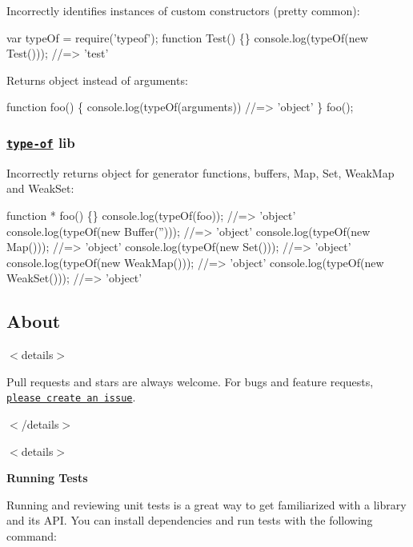 Incorrectly identifies instances of custom constructors (pretty common)\+:


\begin{DoxyCode}
var typeOf = require('typeof');
function Test() \{\}
console.log(typeOf(new Test()));
//=> 'test'
\end{DoxyCode}


Returns {\ttfamily object} instead of {\ttfamily arguments}\+:


\begin{DoxyCode}
function foo() \{
  console.log(typeOf(arguments)) //=> 'object'
\}
foo();
\end{DoxyCode}


\subsubsection*{\href{https://github.com/ForbesLindesay/type-of}{\tt type-\/of} lib}

Incorrectly returns {\ttfamily object} for generator functions, buffers, {\ttfamily Map}, {\ttfamily Set}, {\ttfamily Weak\+Map} and {\ttfamily Weak\+Set}\+:


\begin{DoxyCode}
function * foo() \{\}
console.log(typeOf(foo));
//=> 'object'
console.log(typeOf(new Buffer('')));
//=> 'object'
console.log(typeOf(new Map()));
//=> 'object'
console.log(typeOf(new Set()));
//=> 'object'
console.log(typeOf(new WeakMap()));
//=> 'object'
console.log(typeOf(new WeakSet()));
//=> 'object'
\end{DoxyCode}


\subsection*{About}

$<$details$>$

Pull requests and stars are always welcome. For bugs and feature requests, \href{../../issues/new}{\tt please create an issue}.

$<$/details$>$

$<$details$>$ 

{\bfseries Running Tests}

Running and reviewing unit tests is a great way to get familiarized with a library and its A\+PI. You can install dependencies and run tests with the following command\+:




